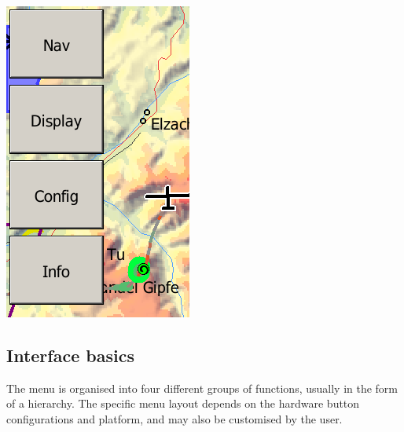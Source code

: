 \begin{center}
\includegraphics[angle=0,width=\linewidth,keepaspectratio='true']{figures/buttonmenu.png}
\end{center}

\subsection*{Interface basics}
The menu is organised into four different groups of functions, usually in
the form of a hierarchy.  The specific menu layout depends on the
hardware button configurations and platform, and may also be customised by the
user.

